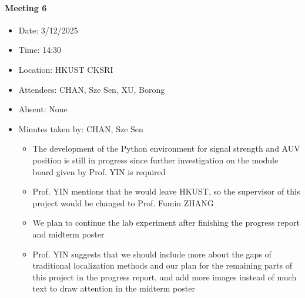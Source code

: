 \documentclass[11pt]{article}
\begin{document}
    \paragraph{Meeting 6}
    \begin{itemize}
        \item Date: 3/12/2025
        \item Time: 14:30
        \item Location: HKUST CKSRI
        \item Attendees: CHAN, Sze Sen, XU, Borong
        \item Absent: None
        \item Minutes taken by: CHAN, Sze Sen
        \begin{itemize}
            \item The development of the Python environment for signal strength and AUV position is still in progress since further investigation on the module board given by Prof. YIN is required
            \item Prof. YIN mentions that he would leave HKUST, so the supervisor of this project would be changed to Prof. Fumin ZHANG
            \item We plan to continue the lab experiment after finishing the progress report and midterm poster
            \item Prof. YIN suggests that we should include more about the gaps of traditional localization methods and our plan for the remaining parts of this project in the progress report, and add more images instead of much text to draw attention in the midterm poster
        \end{itemize}
    \end{itemize}
    
\end{document}
